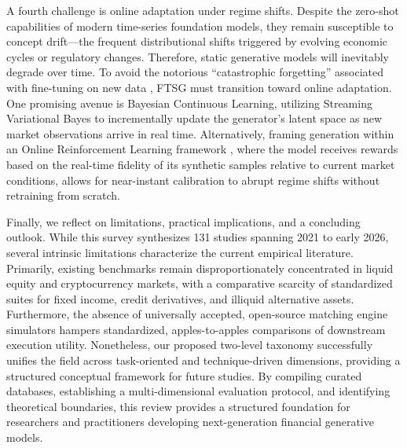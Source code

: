 A fourth challenge is online adaptation under regime shifts. Despite the zero-shot capabilities of modern time-series foundation models, they remain susceptible to concept drift---the frequent distributional shifts triggered by evolving economic cycles or regulatory changes. Therefore, static generative models will inevitably degrade over time. To avoid the notorious ``catastrophic forgetting'' associated with fine-tuning on new data \cite{mccloskey1989catastrophic, zenke2017continual}, FTSG must transition toward online adaptation.
One promising avenue is Bayesian Continuous Learning, utilizing Streaming Variational Bayes \cite{nguyen2017variational} to incrementally update the generator's latent space as new market observations arrive in real time. Alternatively, framing generation within an Online Reinforcement Learning framework \cite{moody2001learning}, where the model receives rewards based on the real-time fidelity of its synthetic samples relative to current market conditions, allows for near-instant calibration to abrupt regime shifts without retraining from scratch.

Finally, we reflect on limitations, practical implications, and a concluding outlook. While this survey synthesizes 131 studies spanning 2021 to early 2026, several intrinsic limitations characterize the current empirical literature. Primarily, existing benchmarks remain disproportionately concentrated in liquid equity and cryptocurrency markets, with a comparative scarcity of standardized suites for fixed income, credit derivatives, and illiquid alternative assets. Furthermore, the absence of universally accepted, open-source matching engine simulators hampers standardized, apples-to-apples comparisons of downstream execution utility. 
Nonetheless, our proposed two-level taxonomy successfully unifies the field across task-oriented and technique-driven dimensions, providing a structured conceptual framework for future studies. By compiling curated databases, establishing a multi-dimensional evaluation protocol, and identifying theoretical boundaries, this review provides a structured foundation for researchers and practitioners developing next-generation financial generative models.